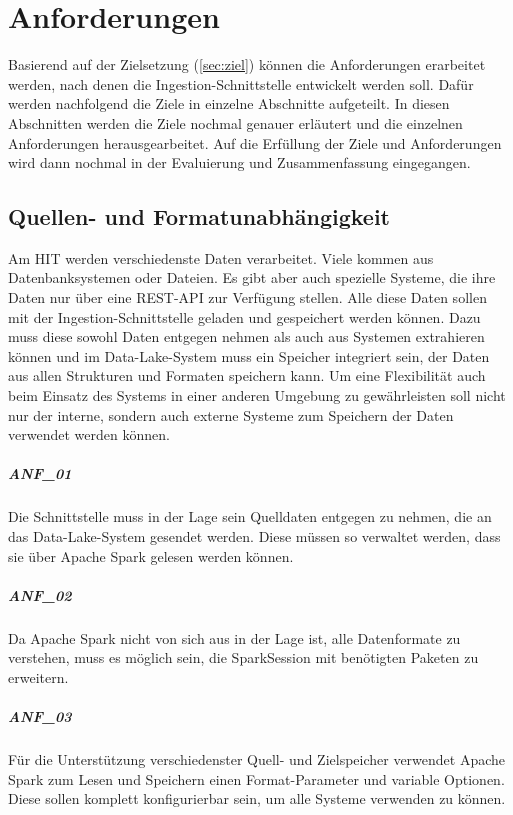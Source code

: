 \chapter{Anforderungen}
\label{sec:anf}

Basierend auf der Zielsetzung (\cref{sec:ziel}) können die Anforderungen erarbeitet werden, nach denen die Ingestion-Schnittstelle entwickelt werden soll.
Dafür werden nachfolgend die Ziele in einzelne Abschnitte aufgeteilt.
In diesen Abschnitten werden die Ziele nochmal genauer erläutert und die einzelnen Anforderungen herausgearbeitet.
Auf die Erfüllung der Ziele und Anforderungen wird dann nochmal in der Evaluierung und Zusammenfassung eingegangen.

\section{Quellen- und Formatunabhängigkeit}
\label{sec:anf-unab}
Am HIT werden verschiedenste Daten verarbeitet.
Viele kommen aus Datenbanksystemen oder Dateien.
Es gibt aber auch spezielle Systeme, die ihre Daten nur über eine REST-API zur Verfügung stellen.
Alle diese Daten sollen mit der Ingestion-Schnittstelle geladen und gespeichert werden können.
Dazu muss diese sowohl Daten entgegen nehmen als auch aus Systemen extrahieren können und im Data-Lake-System muss ein Speicher integriert sein, der Daten aus allen Strukturen und Formaten speichern kann.
Um eine Flexibilität auch beim Einsatz des Systems in einer anderen Umgebung zu gewährleisten soll nicht nur der interne, sondern auch externe Systeme zum Speichern der Daten verwendet werden können.

\paragraph{ANF\_01}
\label{ANF_01}
Die Schnittstelle muss in der Lage sein Quelldaten entgegen zu nehmen, die an das Data-Lake-System gesendet werden.
Diese müssen so verwaltet werden, dass sie über Apache Spark gelesen werden können.

\paragraph{ANF\_02}
\label{ANF_02}
Da Apache Spark nicht von sich aus in der Lage ist, alle Datenformate zu verstehen, muss es möglich sein, die SparkSession mit benötigten Paketen zu erweitern.

\paragraph{ANF\_03}
\label{ANF_03}
Für die Unterstützung verschiedenster Quell- und Zielspeicher verwendet Apache Spark zum Lesen und Speichern einen Format-Parameter und variable Optionen.
Diese sollen komplett konfigurierbar sein, um alle Systeme verwenden zu können.


